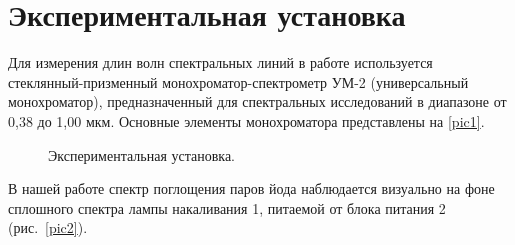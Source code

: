 \documentclass[a4paper, 12pt]{article}%
\begin{document}
\section{Экспериментальная установка}
	Для измерения длин волн спектральных линий в работе используется стеклянный-призменный монохроматор-спектрометр УМ-2 (универсальный монохроматор), предназначенный для спектральных исследований в диапазоне от 0,38 до 1,00 мкм. Основные элементы монохроматора представлены на \ref{pic1}.
	\begin{figure}[h!]
		{\caption{Экспериментальная установка.}}
	\end{figure}
	
	В нашей работе спектр поглощения паров йода наблюдается визуально на фоне сплошного спектра лампы накаливания 1, питаемой от блока питания 2 (рис.~\ref{pic2}).
\end{document}
